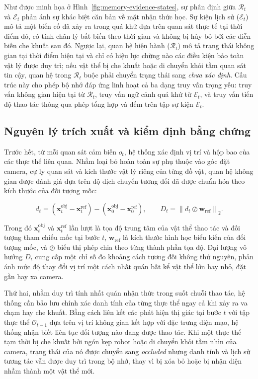 Như được minh họa ở Hình~\ref{fig:memory-evidence-states}, sự phân định giữa $\mathcal R_t$ và $\mathcal E_t$ phản ánh sự khác biệt căn bản về mặt nhận thức học. Sự kiện lịch sử ($\mathcal E_t$) mô tả một biến cố đã xảy ra trong quá khứ dựa trên quan sát thực tế tại thời điểm đó, có tính chân lý bất biến theo thời gian và không bị hủy bỏ bởi các diễn biến che khuất sau đó. Ngược lại, quan hệ hiện hành ($\mathcal R_t$) mô tả trạng thái không gian tại thời điểm hiện tại và chỉ có hiệu lực chừng nào các điều kiện bảo toàn vật lý được duy trì; nếu vật thể bị che khuất hoặc di chuyển khỏi tầm quan sát tin cậy, quan hệ trong $\mathcal R_t$ buộc phải chuyển trạng thái sang \textit{chưa xác định}. Cấu trúc này cho phép bộ nhớ đáp ứng linh hoạt cả ba dạng truy vấn trọng yếu: truy vấn không gian hiện tại từ $\mathcal R_t$, truy vấn ngữ cảnh quá khứ từ $\mathcal E_t$, và truy vấn tiến độ thao tác thông qua phép tổng hợp và đếm trên tập sự kiện $\mathcal E_t$.

\subsection{Nguyên lý trích xuất và kiểm định bằng chứng}

Trước hết, từ mỗi quan sát cảm biến $o_t$, hệ thống xác định vị trí và hộp bao của các thực thể liên quan. Nhằm loại bỏ hoàn toàn sự phụ thuộc vào góc đặt camera, cự ly quan sát và kích thước vật lý riêng của từng đồ vật, quan hệ không gian được đánh giá dựa trên độ dịch chuyển tương đối đã được chuẩn hóa theo kích thước của đối tượng mốc:

\begin{equation}
d_t = (\mathbf x_t^{\mathrm{obj}} - \mathbf x_t^{\mathrm{ref}}) - (\mathbf x_0^{\mathrm{obj}} - \mathbf x_0^{\mathrm{ref}}),\qquad
D_t = \left\| d_t \oslash \mathbf w_{\mathrm{ref}} \right\|_2.
\label{eq:scale-invariant-distance}
\end{equation}

Trong đó $\mathbf x_t^{\mathrm{obj}}$ và $\mathbf x_t^{\mathrm{ref}}$ lần lượt là tọa độ trung tâm của vật thể thao tác và đối tượng tham chiếu mốc tại bước $t$, $\mathbf w_{\mathrm{ref}}$ là kích thước hình học biểu kiến của đối tượng mốc, và $\oslash$ biểu thị phép chia theo từng thành phần tọa độ. Đại lượng vô hướng $D_t$ cung cấp một chỉ số đo khoảng cách tương đối không thứ nguyên, phản ánh mức độ thay đổi vị trí một cách nhất quán bất kể vật thể lớn hay nhỏ, đặt gần hay xa camera.

Thứ hai, nhằm duy trì tính nhất quán nhận thức trong suốt chuỗi thao tác, hệ thống cần bảo lưu chính xác danh tính của từng thực thể ngay cả khi xảy ra va chạm hay che khuất. Bằng cách liên kết các phát hiện thị giác tại bước $t$ với tập thực thể $\mathcal O_{t-1}$ dựa trên vị trí không gian kết hợp với đặc trưng diện mạo, hệ thống nhận biết liên tục đối tượng nào đang được thao tác. Khi một thực thể tạm thời bị che khuất bởi ngón kẹp robot hoặc di chuyển khỏi tầm nhìn của camera, trạng thái của nó được chuyển sang \textit{occluded} nhưng danh tính và lịch sử tương tác vẫn được duy trì trong bộ nhớ, thay vì bị xóa bỏ hoặc bị nhận diện nhầm thành một vật thể mới.


